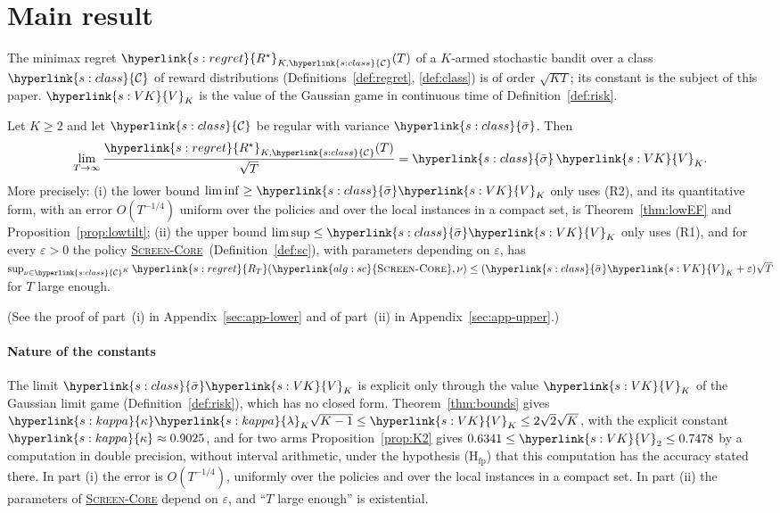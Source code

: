 \documentclass[11pt]{article}
\DeclareRobustCommand{\sy}[2]{{\hyperlink{#1}{#2}}}
\newcommand{\1}{\mathbf{1}}
\newcommand{\RT}{\sy{s:regret}{R_T}}
\newcommand{\Rs}{\sy{s:regret}{R^\star}}
\newcommand{\Cl}{\sy{s:class}{\mathcal C}}
\newcommand{\sbar}{\sy{s:class}{\bar\sigma}}
\newcommand{\VK}{\sy{s:VK}{V}}
\newcommand{\kap}{\sy{s:kappa}{\kappa}}
\newcommand{\lamK}{\sy{s:kappa}{\lambda}}
\newcommand{\SC}{\sy{alg:sc}{\textsc{Screen-Core}}}
\begin{document}
\section{Main result}\label{sec:main}

The minimax regret $\Rs_{K,\Cl}(T)$ of a $K$-armed stochastic bandit over a class $\Cl$ of reward distributions (Definitions~\ref{def:regret}, \ref{def:class})
is of order $\sqrt{KT}$; its constant is the subject of this paper. $\VK_K$ is the value of the Gaussian game in continuous time of Definition~\ref{def:risk}.

\begin{theorem}\label{thm:main}
Let $K\ge2$ and let $\Cl$ be regular with variance $\sbar$. Then
\[
\lim_{T\to\infty}\frac{\Rs_{K,\Cl}(T)}{\sqrt T}=\sbar\,\VK_K .
\]
More precisely: (i) the lower bound $\liminf\ge\sbar\VK_K$ only uses (R2), and its quantitative form, with an error $O(T^{-1/4})$ uniform over the policies and over the local instances in a compact set, is Theorem~\ref{thm:lowEF} and Proposition~\ref{prop:lowtilt};
(ii) the upper bound $\limsup\le\sbar\VK_K$ only uses (R1), and for every $\varepsilon>0$ the policy \SC\ (Definition~\ref{def:sc}), with parameters depending on $\varepsilon$, has
$\sup_{\nu\in\Cl^K}\RT(\SC,\nu)\le(\sbar\VK_K+\varepsilon)\sqrt T$ for $T$ large enough.
\end{theorem}

\noindent (See the proof of part~(i) in Appendix~\ref{sec:app-lower} and of part~(ii) in Appendix~\ref{sec:app-upper}.)

\paragraph{Nature of the constants} The limit $\sbar\VK_K$ is explicit only through the value $\VK_K$ of the Gaussian limit game
(Definition~\ref{def:risk}), which has no closed form. Theorem~\ref{thm:bounds} gives
$\kap\lamK_K\sqrt{K-1}\le\VK_K\le2\sqrt2\sqrt K$, with the explicit constant $\kap\approx0.9025$, and for two arms
Proposition~\ref{prop:K2} gives $0.6341\le\VK_2\le0.7478$ by a computation in double precision, without interval
arithmetic, under the hypothesis (H$_{\mathrm{fp}}$) that this computation has the accuracy stated there. In part (i) the error is $O(T^{-1/4})$, uniformly over the policies and over the local instances in a compact
set. In part (ii) the parameters of \SC{} depend on $\varepsilon$, and ``$T$ large enough'' is existential.
\end{document}
